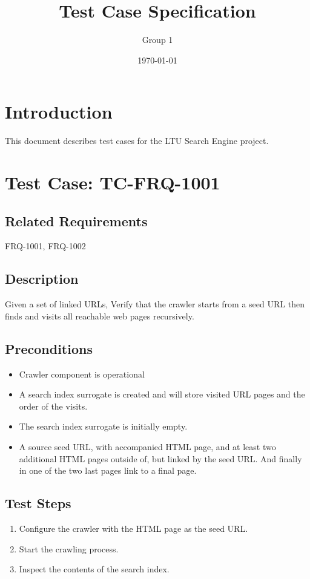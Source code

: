 \documentclass{article}
\title{Test Case Specification}
\author{Group 1}
\date{\today}
\begin{document}
\maketitle

\section{Introduction}
This document describes test cases for the LTU Search Engine project.


\section{Test Case: TC-FRQ-1001}

\subsection*{Related Requirements}
FRQ-1001, FRQ-1002

\subsection*{Description}
Given a set of linked URLs, Verify that the crawler starts from a seed URL then finds and visits all reachable web pages recursively. 

\subsection*{Preconditions}
\begin{itemize}
  \item Crawler component is operational
  \item A search index surrogate is created and will store visited URL pages and the order of the visits.
  \item The search index surrogate is initially empty.
  \item A source seed URL, with accompanied HTML page, and at least two additional HTML pages outside of, but linked by the seed URL. And finally in one of the two last pages link to a final page. 
\end{itemize}

\subsection*{Test Steps}
\begin{enumerate}
  \item Configure the crawler with the HTML page as the seed URL.
  \item Start the crawling process.
  \item Inspect the contents of the search index.
\end{enumerate}
\end{document}
